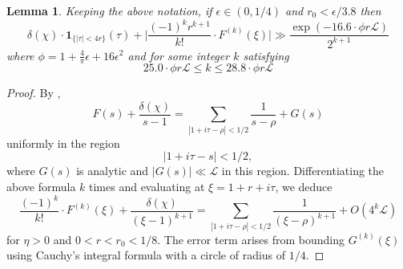\documentclass[12pt,psamsfonts]{amsart}
\newtheorem{lem}[thm]{Lemma}
\theoremstyle{definition}
\theoremstyle{remark}
\numberwithin{equation}{section}
\newcounter{notation}
\theoremstyle{plain}
\theoremstyle{remark}
\renewcommand{\1}{ {\bf 1}}
\newcommand{\cL}{\mathcal{L}}
\begin{document}
 \begin{lem} \label{BigDerivative} Keeping the above notation, if $\epsilon \in (0,1/4)$ and $r_0 < \epsilon/3.8$ then
 \[
\delta(\chi) \cdot \mathbf{1}_{\{ |\tau| < 4 r\}}(\tau) +\Big|   \frac{(-1)^k r^{k+1} }{k!} \cdot  F^{(k)}(\xi)  \Big| \gg \frac{ \exp(-16.6 \cdot \phi r \cL) }{2^{k+1}}
 \]
where $\phi = 1 + \tfrac{4}{\pi} \epsilon + 16\epsilon^2$ and for some integer $k$ satisfying 
 \begin{equation}
 25.0 \cdot \phi r \cL   \leq k \leq 28.8 \cdot \phi r \cL
\label{BigDerivative_kRange}
 \end{equation}
 \end{lem}
 \begin{proof} By \cite[Lemma 1.10]{Weiss}, 
 \[
 F(s) + \frac{\delta(\chi)}{s-1}  = \sum_{|1+i\tau - \rho| < 1/2 } \frac{1}{s-\rho} + G(s)
 \]
uniformly in the region
\[
|1+i\tau - s| < 1/2,
 \]
where $G(s)$ is analytic and $|G(s)| \ll \cL$ in this region. Differentiating the above formula $k$ times and evaluating at $\xi = 1+r+i\tau$, we deduce
\begin{equation}
\label{F_kDerivatives}
\frac{(-1)^k}{k!} \cdot  F^{(k)}(\xi) + \frac{\delta(\chi)}{(\xi-1)^{k+1}} =   \sum_{|1+i\tau - \rho| < 1/2} \frac{1}{(\xi-\rho)^{k+1}}  +  O(4^k \cL)
\end{equation}
for $\eta > 0$ and $0 < r < r_0 < 1/8$. The error term arises from bounding $G^{(k)}(\xi)$ using Cauchy's integral formula with a circle of radius of $1/4$. 


\end{proof}
\end{document}
